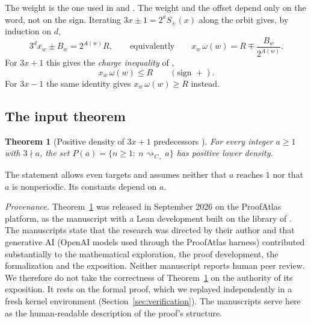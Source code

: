 \documentclass[11pt]{amsart}
\newtheorem{theorem}{Theorem}[section]
\theoremstyle{definition}
\theoremstyle{remark}
\newcommand{\Cp}{C_{+}}
\newcommand{\reach}[1]{\mathrel{\rightsquigarrow_{#1}}}
\begin{document}
The weight is the one used in \cite[(2.1)]{MazurM1} and \cite[(3.1)]{MazurM2}. The weight and the
offset depend only on the word, not on the sign. Iterating $3x\pm1=2^{a}S_\pm(x)$ along the orbit
gives, by induction on $d$,
\begin{equation}\label{eq:affine}
  3^{d}x_w\pm B_w=2^{A(w)}R,\qquad\text{equivalently}\qquad x_w\,\omega(w)=R\mp\frac{B_w}{2^{A(w)}} .
\end{equation}
For $3x+1$ this gives the \emph{charge inequality} of \cite[(3.2)]{MazurM2},
\begin{equation}\label{eq:charge-plus}
  x_w\,\omega(w)\le R\qquad(\text{sign }+).
\end{equation} For $3x-1$ the same identity gives $x_w\,\omega(w)\ge R$ instead.

\subsection{The input theorem}\label{subsec:input}

\begin{theorem}[Positive density of $3x+1$ predecessors {\cite[Theorem~1.1]{MazurM2}}]
\label{thm:input}
For every integer $a\ge1$ with $3\nmid a$, the set $P(a)=\{n\ge1:\ n\reach{\Cp}a\}$ has positive
lower density.
\end{theorem}

The statement allows even targets and assumes neither that $a$ reaches $1$ nor that $a$ is
nonperiodic. Its constants depend on $a$.

\emph{Provenance.} Theorem~\ref{thm:input} was released in September 2026 on the ProofAtlas
platform, as the manuscript \cite{MazurM2} with a Lean development built on the library of
\cite{MazurM1}. The manuscripts state that the research was directed by their author and that
generative AI (OpenAI models used through the ProofAtlas harness) contributed substantially to the
mathematical exploration, the proof development, the formalization and the exposition. Neither
manuscript reports human peer review. We therefore do not take the correctness of
Theorem~\ref{thm:input} on the authority of its exposition. It rests on the formal proof, which we
replayed independently in a fresh kernel environment (Section~\ref{sec:verification}). The manuscripts
serve here as the human-readable description of the proof's structure.
\end{document}
